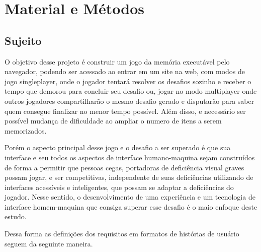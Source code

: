 \chapter{Material e Métodos}
\label{chap:Material e Métodos}

\section{Sujeito}
O objetivo desse projeto é construir um jogo da memória executável pelo navegador, podendo ser acessado ao entrar em um site na web, com modos de jogo singleplayer, onde o jogador tentará resolver os desafios sozinho e receber o tempo que demorou para concluir seu desafio ou, jogar no modo multiplayer onde outros jogadores compartilharão o mesmo desafio gerado e disputarão para saber quem consegue finalizar no menor tempo possível. Além disso, e necessário ser possível mudança de dificuldade ao ampliar o numero de itens a serem memorizados.

Porém o aspecto principal desse jogo e o desafio a ser superado é que sua interface e seu todos os aspectos de interface humano-maquina sejam construídos de forma a permitir que pessoas cegas, portadoras de deficiência visual graves possam jogar, e ser competitivas, independente de suas deficiências utilizando de interfaces acessíveis e inteligentes, que possam se adaptar a deficiências do jogador. Nesse sentido, o desenvolvimento de uma experiência e um tecnologia de interface homem-maquina que consiga superar esse desafio é o maio enfoque deste estudo.

Dessa forma as definições dos requisitos em formatos de histórias de usuário seguem da seguinte maneira.


